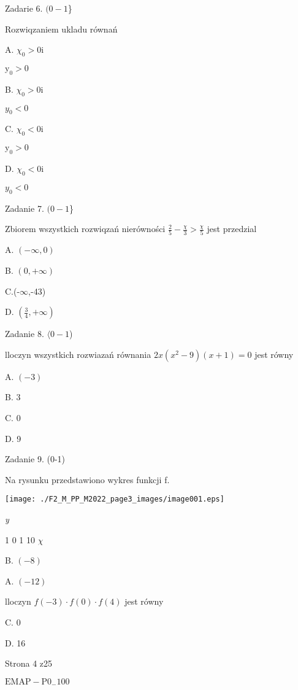 \documentclass[a4paper,12pt]{article}
\begin{document}
Zadarie 6. $(0-1$\}

Rozwiqzaniem ukladu równań 

A. $\chi_{0}>0 \mathrm{i}$

$\mathrm{y}_{0}>0$

B. $\chi_{0}>0 \mathrm{i}$

$y_{0}<0$

C. $\chi_{0}<0 \mathrm{i}$

$\mathrm{y}_{0}>0$

D. $\chi_{0}<0 \mathrm{i}$

$y_{0}<0$

Zadanie 7. $(0-1$\}

Zbiorem wszystkich rozwiqzań nierówności $\displaystyle \frac{2}{5}-\frac{\chi}{3}>\frac{\chi}{5}$ jest przedzial

A. $(-\infty,0)$

B. $(0,+\infty)$

C.(-$\infty$,-43)

D. $(\displaystyle \frac{3}{4},+\infty)$

Zadanie 8. $\langle 0-1$)

lloczyn wszystkich rozwiazań równania $2x(x^{2}-9)(x+1)=0$ jest równy

A. $(-3)$

B. 3

C. 0

D. 9

Zadanie 9. (0-1)

Na rysunku przedstawiono wykres funkcji f.
\begin{center}
\texttt{[image: ./F2\_M\_PP\_M2022\_page3\_images/image001.eps]}
\end{center}
{\it y}

1 0  1  10 $\chi$

B. $(-8)$

A. $(-12)$

lloczyn $f(-3)\cdot f(0)\cdot f(4)$ jest równy

C. 0

D. 16

Strona 4 z25

$\mathrm{E}\mathrm{M}\mathrm{A}\mathrm{P}-\mathrm{P}0_{-}100$
\end{document}
